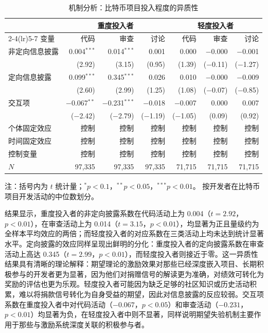 \documentclass[
    type = master, %
    degree = professional,        %
    decl-page,  %
    twoside,                %
    fontset = fandol %
  ]{njuthesis}
\renewcommand{\footnotesize}{\zihao{-5}}
\begin{document}
\begin{table}[htbp]
    \centering
    \caption{机制分析：比特币项目投入程度的异质性}
    \label{tab:mechanism-heavy-light}
    \small
    \begin{tabularx}{\textwidth}{Xrrrrrr}
        \toprule
        & \multicolumn{3}{c}{重度投入者}
        & \multicolumn{3}{c}{轻度投入者} \\
        \cmidrule(lr){2-4}\cmidrule(lr){5-7}
        变量 & 代码 & 审查 & 讨论 & 代码 & 审查 & 讨论 \\
        \midrule
        非定向信息披露
            & 0.004$^{***}$ & 0.014$^{***}$ & 0.001
            & 0.000 & $-$0.000 & $-$0.001 \\
            & (2.92) & (3.15) & (0.95)
            & (1.39) & ($-$0.11) & ($-$1.27) \\[0.4em]
        定向信息披露
            & 0.099$^{***}$ & 0.345$^{***}$ & 0.026
            & 0.010 & $-$0.000 & $-$0.009 \\
            & (2.60) & (2.99) & (1.25)
            & (1.08) & ($-$0.07) & ($-$0.85) \\[0.4em]
        交互项
            & $-$0.067$^{**}$ & $-$0.231$^{***}$ & $-$0.018
            & $-$0.007 & 0.000 & 0.007 \\
            & ($-$2.42) & ($-$2.79) & ($-$1.19)
            & ($-$1.05) & (0.09) & (0.92) \\[0.4em]
        \midrule
        个体固定效应 & 控制 & 控制 & 控制 & 控制 & 控制 & 控制 \\
        时间固定效应 & 控制 & 控制 & 控制 & 控制 & 控制 & 控制 \\
        控制变量 & 控制 & 控制 & 控制 & 控制 & 控制 & 控制 \\
        $N$ & 97,335 & 97,335 & 97,335 & 71,715 & 71,715 & 71,715 \\
        \bottomrule
    \end{tabularx}
    \begin{minipage}{\textwidth}
        \vspace{0.3em}
        \footnotesize 注：括号内为 $t$ 统计量；$^{*}p<0.1$，$^{**}p<0.05$，$^{***}p<0.01$。
        按开发者在比特币项目开发活动的中位数划分。
    \end{minipage}
\end{table}

结果显示，重度投入者的非定向披露系数在代码活动上为 0.004（$t = 2.92$，$p < 0.01$），在审查活动上为 0.014（$t = 3.15$，$p < 0.01$），均显著为正且量级约为全样本平均效应的两倍；而轻度投入者的对应系数在三类活动上均未达到统计显著水平。定向披露的效应同样呈现出鲜明的分化：重度投入者的定向披露系数在审查活动上高达 0.345（$t = 2.99$，$p < 0.01$），而轻度投入者则接近于零。这一异质性结果具有清晰的理论解释：期望理论的激励效果对那些已经深度嵌入项目、长期积极参与的开发者更为显著，因为他们对捐赠信号的解读更为准确，对绩效可转化为奖励的评估也更为乐观。轻度投入者可能因为缺乏足够的社区知识或历史活动积累，难以将捐款信号转化为自身受益的期望，因此对信息披露的反应较弱。交互项系数在重度投入者中对代码活动（$-0.067$，$p < 0.05$）和审查活动（$-0.231$，$p < 0.01$）均显著为负，在轻度投入者中则不显著，同样说明期望失验机制主要作用于那些与激励系统深度关联的积极参与者。
\end{document}

